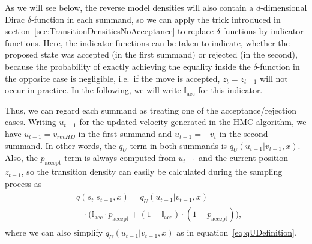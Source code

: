 As we will see below, the reverse model densities will also contain a $d$-dimensional Dirac $\delta$-function in each summand, so we can apply the trick introduced in section~\ref{sec:TransitionDensitiesNoAcceptance} to replace $\delta$-functions by indicator functions. Here, the indicator functions can be taken to indicate, whether the proposed state was accepted (in the first summand) or rejected (in the second), because the probability of exactly achieving the equality inside the $\delta$-function in the opposite case is negligible, i.e.\ if the move is accepted, $z_t = z_{t-1}$ will not occur in practice. In the following, we will write $\mathbb{I}_\textrm{acc}$ for this indicator.

Thus, we can regard each summand as treating one of the acceptance/rejection cases. Writing $u_{t-1}$ for the updated velocity generated in the HMC algorithm, we have $u_{t-1} = v_{revHD}$ in the first summand and $u_{t-1} = -v_t$ in the second summand. In other words, the $q_U$ term in both summands is $q_U(u_{t-1}|v_{t-1}, x)$. Also, the $p_\textrm{accept}$ term is always computed from $u_{t-1}$ and the current position $z_{t-1}$, so the transition density can easily be calculated during the sampling process as
\begin{align}
\begin{split}
&q(s_t|s_{t-1}, x) = q_U(u_{t-1}|v_{t-1}, x) \\
&\;\;\;\cdot \Big( \mathbb{I}_\textrm{acc} \cdot p_{\textrm{accept}} + (1 - \mathbb{I}_\textrm{acc}) \cdot (1- p_{\textrm{accept}}) \Big),
\end{split}
\end{align}
where we can also simplify $q_U(u_{t-1}|v_{t-1}, x)$ as in equation~\eqref{eq:qUDefinition}.

